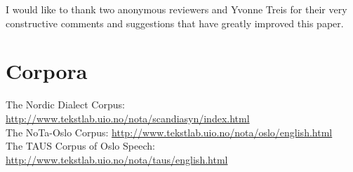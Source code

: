 \documentclass[output=paper,colorlinks,citecolor=brown]{langscibook}
\begin{document}
I would like to thank two anonymous reviewers and  Yvonne Treis for their very constructive comments and suggestions that have greatly improved this paper.

\section*{Corpora}

\small{The Nordic Dialect Corpus: \url{http://www.tekstlab.uio.no/nota/scandiasyn/index.html}\\
The NoTa-Oslo Corpus: \url{http://www.tekstlab.uio.no/nota/oslo/english.html}\\
The TAUS Corpus of Oslo Speech: \url{http://www.tekstlab.uio.no/nota/taus/english.html}}

\sloppy\printbibliography[heading=subbibliography,notkeyword=this]
\end{document}
